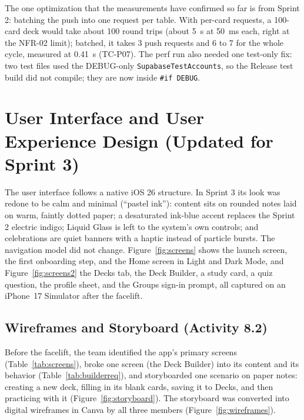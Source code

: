 \documentclass[12pt,letterpaper]{article}
\begin{document}
The one optimization that the measurements have confirmed so far is from Sprint 2:
batching the push into one request per table. With per-card requests, a 100-card
deck would take about 100 round trips (about 5~s at 50~ms each, right at the NFR-02
limit); batched, it takes 3 push requests and 6 to 7 for the whole cycle, measured at
0.41~s (TC-P07). The perf run also needed one test-only fix: two test files used the DEBUG-only
\texttt{SupabaseTestAccounts}, so the Release test build did not compile; they are now
inside \texttt{\#if DEBUG}.

\section{User Interface and User Experience Design (Updated for Sprint 3)}\label{sec:ui}
The user interface follows a native iOS 26 structure. In Sprint 3 its look was
redone to be calm and minimal (``pastel ink''): content sits on rounded
notes laid on warm, faintly dotted paper; a desaturated ink-blue accent replaces the
Sprint 2 electric indigo; Liquid Glass is left to the system's own controls; and
celebrations are quiet banners with a haptic instead of particle bursts. The
navigation model did not change. Figure~\ref{fig:screens} shows the launch screen,
the first onboarding step, and the Home screen in Light and Dark Mode, and
Figure~\ref{fig:screens2} the Decks tab, the Deck Builder, a study card, a quiz
question, the profile sheet, and the Groups sign-in prompt, all captured on an
iPhone~17 Simulator after the facelift.

\subsection{Wireframes and Storyboard (Activity 8.2)}
Before the facelift, the team identified the app's primary screens
(Table~\ref{tab:screens}), broke one screen (the Deck Builder) into its content and its
behavior (Table~\ref{tab:builderreq}), and storyboarded one scenario on paper notes:
creating a new deck, filling in its blank cards, saving it to Decks, and then
practicing with it (Figure~\ref{fig:storyboard}). The storyboard was converted into
digital wireframes in Canva by all three members (Figure~\ref{fig:wireframes}).
\end{document}
